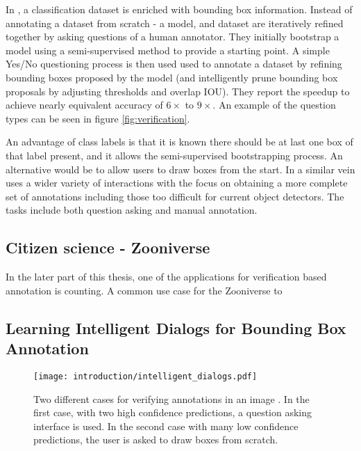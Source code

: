 In \cite{Papadopoulos2016}, a classification dataset is enriched with bounding box information. Instead of annotating a dataset from scratch - a model, and dataset are iteratively refined together by asking questions of a human annotator. They initially bootstrap a model using a semi-supervised method  \cite{Cinbis2017} to provide a starting point. A simple Yes/No questioning process is then used used to annotate a dataset by refining bounding boxes proposed by the model (and intelligently prune bounding box proposals by adjusting thresholds and overlap \gls{IOU}). They report the speedup to achieve nearly equivalent accuracy of $6\times$ to $9\times$. An example of the question types can be seen in figure \ref{fig:verification}. 

An advantage of class labels is that it is known there should be at last one box of that label present, and it allows the semi-supervised bootstrapping process. An alternative would be to allow users to draw boxes from the start. In a similar vein \cite{Russakovsky2015a} uses a wider variety of interactions with the focus on obtaining a more complete set of annotations including those too difficult for current object detectors. The tasks include both question asking and manual annotation.


\subsection{Citizen science - Zooniverse}

In the later part of this thesis, one of the applications for verification based annotation is counting. A common use case for the Zooniverse 
 to \cite{Watson2018}


\subsection{Learning Intelligent Dialogs for Bounding Box Annotation}

\begin{figure}[h]
  \centering
  \texttt{[image: introduction/intelligent\_dialogs.pdf]}
  \caption{Two different cases for verifying annotations in an image \cite{Konyushkova2017}. In the first case, with two high confidence predictions, a question asking interface is used. In the second case with many low confidence predictions, the user is asked to draw boxes from scratch. }
  \label{fig:intelligent_dialogs}
\end{figure}

